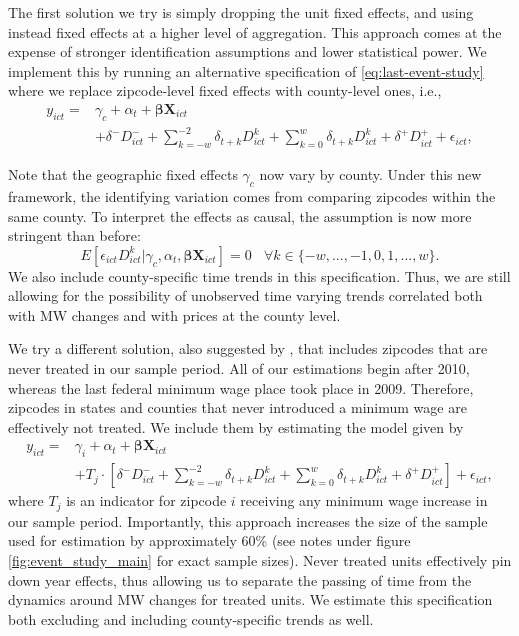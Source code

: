     The first solution we try is simply dropping the unit fixed effects, and using instead fixed effects at a higher level of aggregation. This approach comes at the expense of stronger identification assumptions and lower statistical power. We implement this by running an alternative specification of \eqref{eq:last-event-study} where we replace zipcode-level fixed effects with county-level ones, i.e.,
    \begin{equation}\label{eq:last-event-study-countyFE}
        \begin{split}
            y_{ict} = & \gamma_{c} + \alpha_{t} + \boldsymbol{\beta} \boldsymbol{X}_{ict} \\
            & + \delta^{-} D_{ict}^{-} + \sum\limits_{k = -w}^{-2}\delta_{t + k}D_{ict}^k + \sum\limits_{k = 0}^{w}\delta_{t + k} D_{ict}^k + \delta^{+} D_{ict}^{+} + \epsilon_{ict} ,
        \end{split}   
    \end{equation}
    
    Note that the geographic fixed effects $\gamma_{c}$ now vary by county. Under this new framework, the identifying variation comes from comparing zipcodes within the same county. To interpret the effects as causal, the assumption is now more stringent than before: $$E \left[ \epsilon_{ict} D_{ict}^k | \gamma_c, \alpha_{t}, \boldsymbol{\beta} \boldsymbol{X}_{ict}\right]  = 0 \  \ \ \ \forall k\in\{-w, ..., -1, 0, 1, ..., w\} .$$ We also include county-specific time trends in this specification. Thus, we are still allowing for the possibility of unobserved time varying trends correlated both with MW changes and with prices at the county level.
    
    We try a different solution, also suggested by \textcite{BorusyakJaravel2017}, that includes zipcodes that are never treated in our sample period. All of our estimations begin after 2010, whereas the last federal minimum wage place took place in 2009. Therefore, zipcodes in states and counties that never introduced a minimum wage are effectively not treated. We include them by estimating the model given by
    \begin{equation}\label{eq:last-event-study-control}
        \begin{split}
            y_{ict} = & \gamma_{i} + \alpha_{t} + \boldsymbol{\beta} \boldsymbol{X}_{ict} \\
            & + T_j\cdot\left[\delta^{-} D_{ict}^{-} + \sum\limits_{k = -w}^{-2}\delta_{t + k}D_{ict}^k + \sum\limits_{k = 0}^{w}\delta_{t + k} D_{ict}^k + \delta^{+} D_{ict}^{+}\right] + \epsilon_{ict} , 
        \end{split}   
    \end{equation}
    where $T_j$ is an indicator for zipcode $i$ receiving any minimum wage increase in our sample period. Importantly, this approach increases the size of the sample used for estimation by approximately 60\% (see notes under figure \ref{fig:event_study_main} for exact sample sizes). Never treated units effectively pin down year effects, thus allowing us to separate the passing of time from the dynamics around MW changes for treated units. We estimate this specification both excluding and including county-specific trends as well.
    
